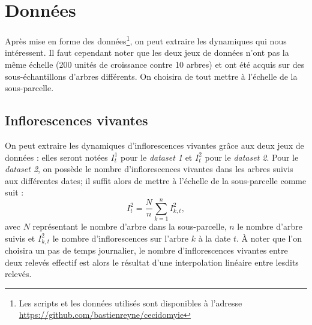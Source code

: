 \section{Données}

Après mise en forme des données\footnote{Les scripts et les données utilisés sont disponibles à l'adresse \url{https://github.com/bastienreyne/cecidomyie}}, on peut extraire les dynamiques qui nous intéressent.
Il faut cependant noter que les deux jeux de données n'ont pas la même échelle (200 unités de croissance contre 10 arbres) et ont été acquis sur des sous-échantillons d'arbres différents.
On choisira de tout mettre à l'échelle de la sous-parcelle.

\subsection{Inflorescences vivantes}

On peut extraire les dynamiques d'inflorescences vivantes grâce aux deux jeux de données : elles seront notées $I^1_t$ pour le \emph{dataset 1} et $I^2_t$ pour le \emph{dataset 2}.
Pour le \emph{dataset 2}, on possède le nombre d'inflorescences vivantes dans les arbres suivis aux différentes dates; il suffit alors de mettre à l'échelle de la sous-parcelle comme suit :
\[
I_{t}^{2} = \frac{N}{n}\sum_{k=1}^{n} I^{2}_{k, t},
\]
avec $N$ représentant le nombre d'arbre dans la sous-parcelle, $n$ le nombre d'arbre suivis et $I^{2}_{k, t}$ le nombre d'inflorescences sur l'arbre $k$ à la date $t$.
À noter que l'on choisira un pas de temps journalier, le nombre d'inflorescences vivantes entre deux relevés effectif est alors le résultat d'une interpolation linéaire entre lesdits relevés.

